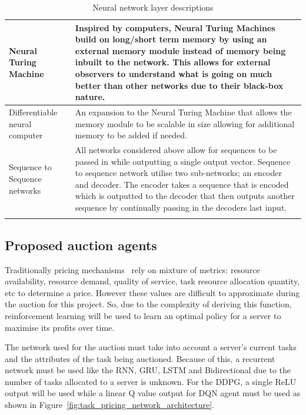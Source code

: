 \begin{longtable}{|p{3.5cm}|p{10cm}|}
    Neural Turing Machine~\citep{NTM} & Inspired by computers, Neural Turing Machines build on long/short term memory
        by using an external memory module instead of memory being inbuilt to the network. This allows for external
        observers to understand what is going on much better than other networks due to their black-box nature. \\ \hline

    Differentiable neural computer~\citep{DNC} & An expansion to the Neural Turing Machine that allows the memory
        module to be scalable in size allowing for additional memory to be added if needed. \\ \hline

    Sequence to Sequence networks~\cite{seq2seq} & All networks considered above allow for sequences to be passed in
        while outputting a single output vector. Sequence to sequence network utilise two sub-networks; an encoder and
        decoder. The encoder takes a sequence that is encoded which is outputted to the decoder that then outputs
        another sequence by continually passing in the decoders last input. \\ \hline
    \caption{Neural network layer descriptions}
    \label{tab:neural_network_layers}
\end{longtable}

\subsection{Proposed auction agents}\label{subsec:proposed-auction-agents}
Traditionally pricing mechanisms~\citep{al2013cloud} rely on mixture of metrics: resource availability, resource demand,
quality of service, task resource allocation quantity, etc to determine a price. However
these values are difficult to approximate during the auction for this project. So, due to the complexity of
deriving this function, reinforcement learning will be used to learn an optimal policy for a server to maximise its
profits over time.

The network used for the auction must take into account a server's current tasks and the attributes of the task being
auctioned. Because of this, a recurrent network must be used like the RNN, GRU, LSTM and Bidirectional due to the number
of tasks allocated to a server is unknown. For the DDPG, a single ReLU output will be used while a linear Q value output
for DQN agent must be used as shown in Figure~\ref{fig:task_pricing_network_architecture}.

